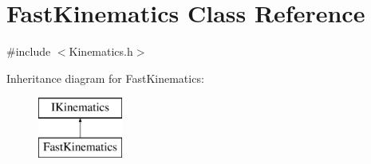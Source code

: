 \hypertarget{classFastKinematics}{\section{Fast\-Kinematics Class Reference}
\label{classFastKinematics}
}


{\ttfamily \#include $<$Kinematics.\-h$>$}

Inheritance diagram for Fast\-Kinematics\-:\begin{figure}[H]
\begin{center}
\leavevmode
\includegraphics[height=2.000000cm]{classFastKinematics}
\end{center}
\end{figure}
